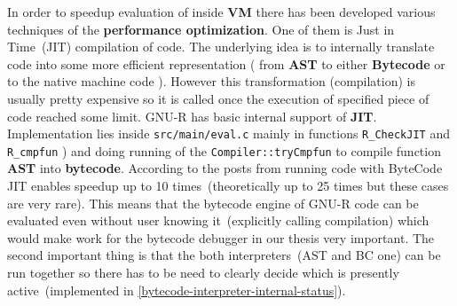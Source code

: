 \documentclass[thesis=M,english]{FITthesis}[2018/10/20]
\newcommand{\code}[1]{\texttt{#1}}
\begin{document}
In order to speedup evaluation of inside \textbf{VM} there has been developed various techniques of the \textbf{performance optimization}. One of them is Just in Time~(JIT) compilation of code. The underlying idea is to internally translate code into some more efficient representation ( from \textbf{AST} to either \textbf{Bytecode} or to the native machine code ). However this transformation (compilation) is usually pretty expensive so it is called once the execution of specified piece of code reached some limit.
GNU-R has basic internal support of \textbf{JIT}. Implementation lies inside \code{src/main/eval.c} mainly in functions \code{R{\_}CheckJIT} and \code{R{\_}cmpfun} ) and doing running of the \code{Compiler::tryCmpfun} to compile function \textbf{AST} into \textbf{bytecode}. According to the posts from running code with ByteCode JIT enables speedup up to 10 times~(theoretically up to 25 times but these cases are very rare).
This means that the bytecode engine of GNU-R code can be evaluated even without user knowing it~(explicitly calling compilation) which would make work for the bytecode debugger in our thesis very important. The second important thing is that the both interpreters~(AST and BC one) can be run together so there has to be need to clearly decide which is presently active~(implemented in \ref{bytecode-interpreter-internal-status}).


%
%
%
%
%
%
%
%
%
%
%
%
%
%
%
\end{document}
